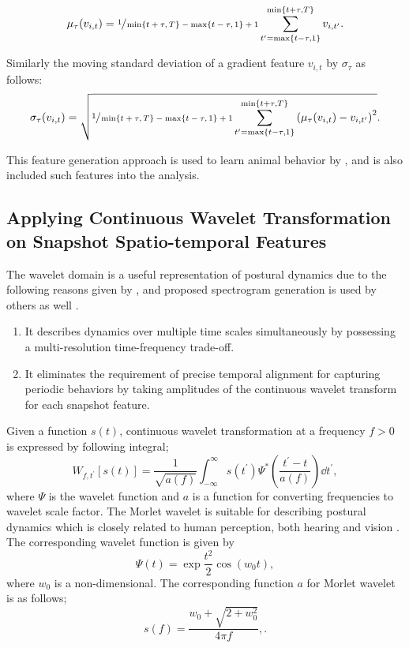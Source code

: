 \begin{equation}
	\mu_{\tau}(v_{i,t}) = \sfrac{1}{\min\{t+\tau,T\}-\max\{t-\tau,1\}+1} \sum_{t^{\prime}=\max\{t-\tau,1\}}^{\min\{t+\tau,T\}} v_{i, t^{\prime}}.
\end{equation}

Similarly the moving standard deviation of a gradient feature $v_{i,t}$ by $\sigma_\tau$ as follows:
\begin{equation}
	\sigma_\tau(v_{i,t}) = \sqrt{\sfrac{1}{\min\{t+\tau,T\}-\max\{t-\tau,1\}+1} \sum_{t^{\prime}=\max\{t-\tau,1\}}^{\min\{t+\tau,T\}} \left(\mu_{\tau}(v_{i,t}) - v_{i, t^{\prime}}\right)^2}.
\end{equation}

This feature generation approach is used to learn animal behavior by \citet{kabra_jaaba_2013}, and \citet{marshall_continuous_2021} is also included such features into the analysis.

\subsection{Applying Continuous Wavelet Transformation on Snapshot Spatio-temporal Features}
The wavelet domain is a useful representation of postural dynamics due to the following reasons given by \citet{berman_mapping_2014}, and proposed spectrogram generation is used by others as well \citep{marshall_continuous_2021, todd_systematic_2017}.
\begin{enumerate}
	\item It describes dynamics over multiple time scales simultaneously by possessing a multi-resolution time-frequency trade-off.
	\item It eliminates the requirement of precise temporal alignment for capturing periodic behaviors by taking amplitudes of the continuous wavelet transform for each snapshot feature.
\end{enumerate}
Given a function $s(t)$, continuous wavelet transformation at a frequency $f>0$ is expressed by following integral;
\begin{equation}
	W_{f,t^{\prime}}[s(t)] = \frac{1}{\sqrt{a(f)}} \int_{-\infty}^{\infty} s(t^{\prime}) \mathit{\Psi}^{\ast}\left(\frac{t^{\prime}-t}{a(f)}\right) \dd{t^{\prime}},
\end{equation}
where $\Psi$ is the wavelet function and $a$ is a function for converting frequencies to wavelet scale factor.
The Morlet wavelet is suitable for describing postural dynamics which is closely related to human perception, both hearing and vision \citep{daugman_uncertainty_1985}.
The corresponding wavelet function is given by
\begin{equation}
	\Psi(t) = \exp{\frac{t^2}{2}} \cos(w_0t),
\end{equation}
where $w_0$ is a non-dimensional. The corresponding function $a$ for Morlet wavelet is as follows;
\begin{equation}
	s(f) = \frac{w_0 + \sqrt{2+w_0^2}}{4 \pi f},.
\end{equation}

